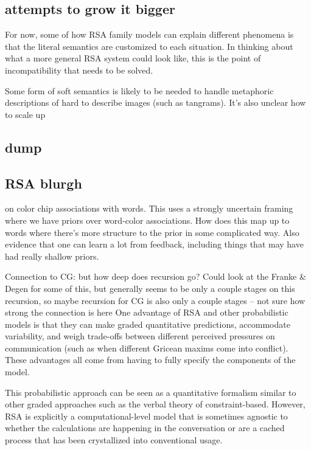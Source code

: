 \documentclass[]{article}
\begin{document}
\subsection{attempts to grow it bigger}


For now, some of how RSA family models can explain different phenomena is that the literal semantics are customized to each situation. In thinking about what a more general RSA system could look like, this is the point of incompatibility that needs to be solved. 

Some form of soft semantics is likely to be needed to handle metaphoric descriptions of hard to describe images (such as tangrams). It's also unclear how to scale up 

\subsection{dump}
\subsection{RSA blurgh}

\cite{murthy2022} on color chip associations with words. This uses a strongly uncertain framing where we have priors over word-color associations. How does this map up to words where there's more structure to the prior in some complicated way. Also evidence that one can learn a lot from feedback, including things that may have had really shallow priors. 

Connection to CG: but how deep does recursion go? Could look at the Franke \& Degen for some of this, but generally seems to be only a couple stages on this recursion, so maybe recursion for CG is also only a couple stages -- not sure how strong the connection is here
One advantage of RSA and other probabilistic models is that they can make graded quantitative predictions, accommodate variability, and weigh trade-offs between different perceived pressures on communication (such as when different Gricean maxims come into conflict). These advantages all come from having to fully specify the components of the model. 

This probabilistic approach can be seen as a quantitative formalism similar to other graded approaches such as the verbal theory of constraint-based. However, RSA is explicitly a computational-level model that is sometimes agnostic to whether the calculations are happening in the conversation or are a cached process that has been crystallized into conventional usage. 
\end{document}
